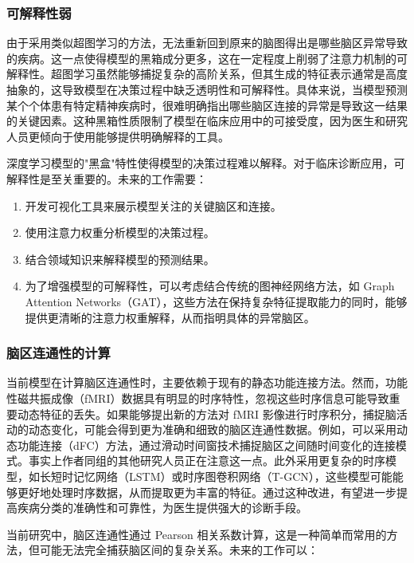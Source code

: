 \documentclass[12pt,a4paper]{article}
\begin{document}
\subsubsection{可解释性弱}

由于采用类似超图学习的方法，无法重新回到原来的脑图得出是哪些脑区异常导致的疾病。这一点使得模型的黑箱成分更多，这在一定程度上削弱了注意力机制的可解释性。超图学习虽然能够捕捉复杂的高阶关系，但其生成的特征表示通常是高度抽象的，这导致模型在决策过程中缺乏透明性和可解释性。具体来说，当模型预测某个个体患有特定精神疾病时，很难明确指出哪些脑区连接的异常是导致这一结果的关键因素。这种黑箱性质限制了模型在临床应用中的可接受度，因为医生和研究人员更倾向于使用能够提供明确解释的工具。

深度学习模型的"黑盒"特性使得模型的决策过程难以解释。对于临床诊断应用，可解释性是至关重要的。未来的工作需要：

\begin{enumerate}
\item 开发可视化工具来展示模型关注的关键脑区和连接。
\item 使用注意力权重分析模型的决策过程。
\item 结合领域知识来解释模型的预测结果。
\item 为了增强模型的可解释性，可以考虑结合传统的图神经网络方法，如 Graph Attention Networks（GAT），这些方法在保持复杂特征提取能力的同时，能够提供更清晰的注意力权重解释，从而指明具体的异常脑区。
\end{enumerate}

\subsubsection{脑区连通性的计算}

当前模型在计算脑区连通性时，主要依赖于现有的静态功能连接方法。然而，功能性磁共振成像（fMRI）数据具有明显的时序特性，忽视这些时序信息可能导致重要动态特征的丢失。如果能够提出新的方法对 fMRI 影像进行时序积分，捕捉脑活动的动态变化，可能会得到更为准确和细致的脑区连通性数据。例如，可以采用动态功能连接（dFC）方法，通过滑动时间窗技术捕捉脑区之间随时间变化的连接模式。事实上作者同组的其他研究人员正在注意这一点。此外采用更复杂的时序模型，如长短时记忆网络（LSTM）或时序图卷积网络（T-GCN），这些模型可能能够更好地处理时序数据，从而提取更为丰富的特征。通过这种改进，有望进一步提高疾病分类的准确性和可靠性，为医生提供强大的诊断手段。

当前研究中，脑区连通性通过 Pearson 相关系数计算，这是一种简单而常用的方法，但可能无法完全捕获脑区间的复杂关系。未来的工作可以：
\end{document}
